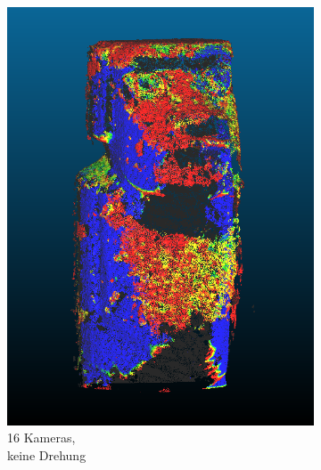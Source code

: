 \documentclass[./00PhotoBox.tex]{subfiles}
\begin{document}
\begin{figure}
\begin{subfigure}{0.24\textwidth}
        \includegraphics[width=1\linewidth]{img/cam_anzahl/twothirds2.png}
        \centering
        \caption{16 Kameras,\\keine Drehung} %
        \label{img:moai_2von3} %
    \end{subfigure}
    \begin{subfigure}{0.24\textwidth}

\end{subfigure}
\end{figure}
\end{document}
